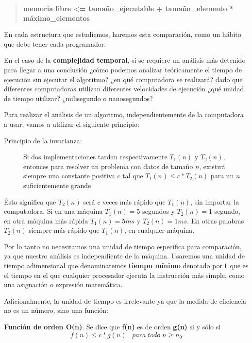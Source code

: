 \begin{quote}
   \textbf{memoria libre <= tamaño\_ejecutable + tamaño\_elemento * máximo\_elementos}
\end{quote}

En cada estructura que estudiemos, haremos esta comparación, como un
hábito que debe tener cada programador.

En el caso de la \textbf{complejidad temporal}, sí se requiere un
análisis más detenido para llegar a una conclusión ¿cómo podemos
analizar teóricamente el tiempo de ejecución sin ejecutar el
algoritmo? ¿en qué computadora se realizará? dado que diferentes
computadoras utilizan diferentes velocidades de ejecución ¿qué unidad
de tiempo utilizar?  ¿milisegundo o nanosegundos?

Para realizar el análisis de un algoritmo, independientemente de la
computadora a usar, vamos a utilizar el siguiente principio:

\begin{description}
\item[Principio de la invarianza: ] Si dos implementaciones tardan
  respectivamente $T_1(n)$ y $T_2(n)$, entonces para resolver un problema
  con datos de tamaño $n$, existirá siempre una constante positiva $c$ tal
  que $T_1(n) \leq c * T_2(n)$ para un $n$ suficientemente grande
\end{description}

Ésto significa que $T_2(n)$ será $c$ veces más rápido que $T_1(n)$, sin
importar la computadora.  Si en una máquina $T_1(n)= 5$ segundos y $T_2(n)=
1$ segundo, en otra máquina más rápida $T_1(n)= 5 ms$ y $T_2(n)= 1 ms$.  En
otras palabras $T_2(n)$ siempre más rápido que $T_1(n)$, en cualquier
máquina.

Por lo tanto no necesitamos una unidad de tiempo específica para
comparación, ya que nuestro análisis es independiente de la máquina.
Usaremos una unidad de tiempo adimensional que denominaremos
\textbf{tiempo mínimo} denotado por \textbf{t} que es el tiempo en el
que cualquier procesador ejecuta la instrucción más simple, como una
asignación o expresión matemática.

Adicionalmente, la unidad de tiempo es irrelevante ya que la medida de
eficiencia no es un número, sino una función:

\begin{definicion}
  \textbf{Función de orden O(n)}.  Se dice que \textbf{f(n)} es de
  orden \textbf{g(n)} si y sólo si
  \[ f(n) \leq c * g(n)  \;\;\; para\; todo\; n \geq n_0 \]
\end{definicion}

